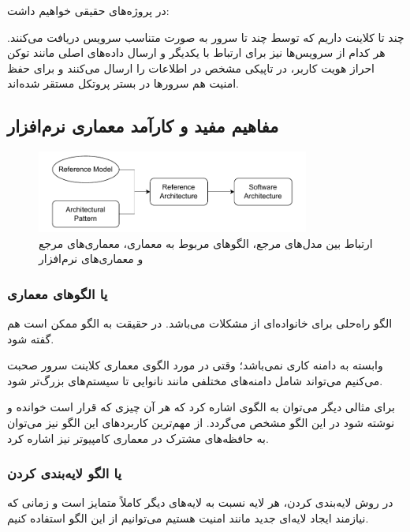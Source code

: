\documentclass[a4paper]{article}
\begin{document}
در پروژه‌های حقیقی خواهیم داشت:

چند تا کلاینت داریم که توسط چند تا سرور به صورت متناسب سرویس دریافت می‌کنند. هر
کدام از سرویس‌ها نیز برای ارتباط با یکدیگر و ارسال داده‌های اصلی مانند توکن
احراز هویت کاربر، در تاپیکی مشخص در  اطلاعات را ارسال می‌کنند و برای
حفظ امنیت هم سرور‌ها در بستر پروتکل  مستقر شده‌اند.

\subsection{مفاهیم مفید و کارآمد معماری نرم‌افزار}

\begin{figure}[H]
    \centering
    \includegraphics[width=0.8\textwidth]{images/box_and_arrow_sa.drawio.pdf}
    \caption{ارتباط بین مدل‌های مرجع، الگو‌های مربوط به معماری، معماری‌های مرجع
    و معماری‌های نرم‌افزار}
    \label{fig:saStages}
\end{figure}

\subsubsection{ یا الگو‌های معماری}

الگو راه‌حلی برای خانواده‌ای از مشکلات می‌باشد. در حقیقت به الگو ممکن است
 هم گفته شود.

وابسته به دامنه کاری نمی‌باشد؛ وقتی در مورد الگوی معماری کلاینت سرور صحبت
می‌کنیم می‌تواند شامل دامنه‌های مختلفی مانند نانوایی تا سیستم‌های بزرگ‌تر شود.

برای مثالی دیگر می‌توان به الگوی  اشاره کرد که هر آن چیزی که
قرار است خوانده و نوشته شود در این الگو مشخص می‌گردد. از مهم‌ترین کاربرد‌های این
الگو نیز می‌توان به حافظه‌های مشترک در معماری کامپیوتر نیز اشاره کرد.

\subsubsection{ یا الگو لایه‌بندی کردن}

در روش لایه‌بندی کردن، هر لایه نسبت به لایه‌های دیگر کاملاً متمایز است و زمانی
که نیازمند ایجاد لایه‌ای جدید مانند امنیت هستیم می‌توانیم از این الگو استفاده
کنیم.
\end{document}
